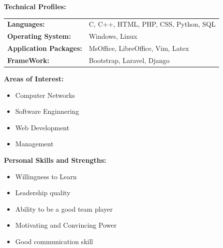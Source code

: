\documentclass[paper = a4paper, 12pt]{article}
\begin{document}
\vspace{8mm}
{\Large \textbf{ Technical Profiles: } \\
}
\begin{tabular}{l l}
	\textbf{Languages:} & C, C++, HTML, PHP, CSS, Python, SQL \\
	\textbf{Operating System:} & Windows, Linux \\
	\textbf{Application Packages:} & MsOffice, LibreOffice, Vim, Latex \\ 
	\textbf{FrameWork: } & Bootstrap, Laravel, Django \\
	
\end{tabular}

\vspace{8mm}
{\Large \textbf{Areas of Interest:} \\
}
\vspace{-5mm}
\begin{itemize}[noitemsep]
\addtolength{\leftskip}{8mm}	
	\item Computer Networks
	\item Software Enginnering
	\item Web Development
	\item Management
\end{itemize}

\vspace{8mm}
{\Large \textbf{Personal Skills and Strengths:}\\
}
\vspace{-5mm}
\begin{itemize}[noitemsep]
\addtolength{\leftskip}{8mm}
	\item Willingness to Learn
	\item Leadership quality
	\item Ability to be a good team player
	\item Motivating and Convincing Power
	\item Good communication skill
\end{itemize}

\vspace{8mm}
\end{document}
